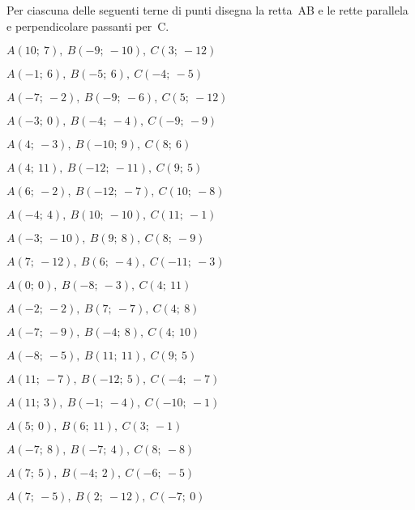 \newpage

\subsubsection*{}

\begin{esercizio}\label{ese:}
 Per ciascuna delle seguenti terne di 
punti disegna la retta~AB e le rette parallela e perpendicolare passanti 
per~C.
\begin{multicols}{2}
 \begin{enumeratea}
  \item  $A(10;~7),~B(-9;~-10),~C(3;~-12)$
  \item  $A(-1;~6),~B(-5;~6),~C(-4;~-5)$
  \item  $A(-7;~-2),~B(-9;~-6),~C(5;~-12)$
  \item  $A(-3;~0),~B(-4;~-4),~C(-9;~-9)$
  \item  $A(4;~-3),~B(-10;~9),~C(8;~6)$
  \item  $A(4;~11),~B(-12;~-11),~C(9;~5)$
  \item  $A(6;~-2),~B(-12;~-7),~C(10;~-8)$
  \item  $A(-4;~4),~B(10;~-10),~C(11;~-1)$
  \item  $A(-3;~-10),~B(9;~8),~C(8;~-9)$
  \item  $A(7;~-12),~B(6;~-4),~C(-11;~-3)$
  \item  $A(0;~0),~B(-8;~-3),~C(4;~11)$
  \item  $A(-2;~-2),~B(7;~-7),~C(4;~8)$
  \item  $A(-7;~-9),~B(-4;~8),~C(4;~10)$
  \item  $A(-8;~-5),~B(11;~11),~C(9;~5)$
  \item  $A(11;~-7),~B(-12;~5),~C(-4;~-7)$
  \item  $A(11;~3),~B(-1;~-4),~C(-10;~-1)$
  \item  $A(5;~0),~B(6;~11),~C(3;~-1)$
  \item  $A(-7;~8),~B(-7;~4),~C(8;~-8)$
  \item  $A(7;~5),~B(-4;~2),~C(-6;~-5)$
  \item  $A(7;~-5),~B(2;~-12),~C(-7;~0)$
 \end{enumeratea}
\end{multicols}
\end{esercizio}

\subsubsection*{}


